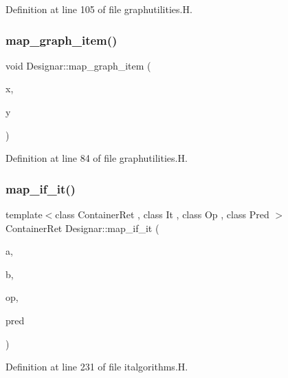 Definition at line 105 of file graphutilities.\+H.

\mbox{\label{namespace_designar_a9f88b21c36d5175a156085da54ae0142}} 
\subsubsection{\texorpdfstring{map\+\_\+graph\+\_\+item()}{map\_graph\_item()}}
{\footnotesize\ttfamily void Designar\+::map\+\_\+graph\+\_\+item (\begin{DoxyParamCaption}\item[{\hyperlink{class_designar_1_1_common_node_arc}{Common\+Node\+Arc} \&}]{x,  }\item[{\hyperlink{class_designar_1_1_common_node_arc}{Common\+Node\+Arc} \&}]{y }\end{DoxyParamCaption})\hspace{0.3cm}{\ttfamily [inline]}}



Definition at line 84 of file graphutilities.\+H.

\mbox{\label{namespace_designar_ac984c3a6f2c6c94cee1ab57e8fddd3a8}} 
\subsubsection{\texorpdfstring{map\+\_\+if\+\_\+it()}{map\_if\_it()}\hspace{0.1cm}{\footnotesize\ttfamily [1/4]}}
{\footnotesize\ttfamily template$<$class Container\+Ret , class It , class Op , class Pred $>$ \\
Container\+Ret Designar\+::map\+\_\+if\+\_\+it (\begin{DoxyParamCaption}\item[{const It \&}]{a,  }\item[{const It \&}]{b,  }\item[{Op \&}]{op,  }\item[{Pred \&}]{pred }\end{DoxyParamCaption})}



Definition at line 231 of file italgorithms.\+H.

